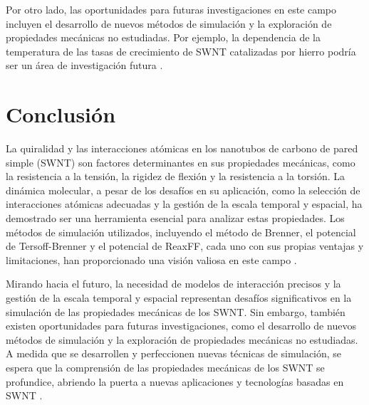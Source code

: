 \documentclass[a4paper]{article}
\begin{document}
Por otro lado, las oportunidades para futuras investigaciones en este campo incluyen el desarrollo de nuevos métodos de simulación y la exploración de propiedades mecánicas no estudiadas. Por ejemplo, la dependencia de la temperatura de las tasas de crecimiento de SWNT catalizadas por hierro podría ser un área de investigación futura \cite{irle2009milestones}.

\section{Conclusión}


La quiralidad y las interacciones atómicas en los nanotubos de carbono de pared simple (SWNT) son factores determinantes en sus propiedades mecánicas, como la resistencia a la tensión, la rigidez de flexión y la resistencia a la torsión. La dinámica molecular, a pesar de los desafíos en su aplicación, como la selección de interacciones atómicas adecuadas y la gestión de la escala temporal y espacial, ha demostrado ser una herramienta esencial para analizar estas propiedades. Los métodos de simulación utilizados, incluyendo el método de Brenner, el potencial de Tersoff-Brenner y el potencial de ReaxFF, cada uno con sus propias ventajas y limitaciones, han proporcionado una visión valiosa en este campo \cite{avila2008molecular, mylvaganam2004important, irle2009milestones, li2006modeling}.

Mirando hacia el futuro, la necesidad de modelos de interacción precisos y la gestión de la escala temporal y espacial representan desafíos significativos en la simulación de las propiedades mecánicas de los SWNT. Sin embargo, también existen oportunidades para futuras investigaciones, como el desarrollo de nuevos métodos de simulación y la exploración de propiedades mecánicas no estudiadas. A medida que se desarrollen y perfeccionen nuevas técnicas de simulación, se espera que la comprensión de las propiedades mecánicas de los SWNT se profundice, abriendo la puerta a nuevas aplicaciones y tecnologías basadas en SWNT \cite{irle2009milestones}.

\printbibliography
\end{document}
